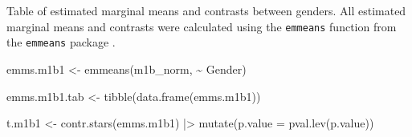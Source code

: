 \documentclass[
  bookmarksnumbered]{article}
\newenvironment{Shaded}{\begin{snugshade}}{\end{snugshade}}
\newcommand{\AttributeTok}[1]{\textcolor[rgb]{0.80,0.80,0.80}{#1}}
\newcommand{\FunctionTok}[1]{\textcolor[rgb]{0.94,0.94,0.56}{#1}}
\newcommand{\NormalTok}[1]{\textcolor[rgb]{0.80,0.80,0.80}{#1}}
\newcommand{\OtherTok}[1]{\textcolor[rgb]{0.94,0.94,0.56}{#1}}
\newcommand{\SpecialCharTok}[1]{\textcolor[rgb]{0.86,0.64,0.64}{#1}}
\begin{document}
Table of estimated marginal means and contrasts between genders. All estimated marginal means and contrasts were calculated using the \texttt{emmeans} function from the \texttt{emmeans} package \autocite{emmeanscit}.

\begin{Shaded}
\begin{Highlighting}[]
\NormalTok{emms.m1b1 }\OtherTok{\textless{}{-}} \FunctionTok{emmeans}\NormalTok{(m1b\_norm, }\SpecialCharTok{\textasciitilde{}}\NormalTok{ Gender)}

\NormalTok{emms.m1b1.tab }\OtherTok{\textless{}{-}} \FunctionTok{tibble}\NormalTok{(}\FunctionTok{data.frame}\NormalTok{(emms.m1b1))}

\NormalTok{t.m1b1 }\OtherTok{\textless{}{-}} \FunctionTok{contr.stars}\NormalTok{(emms.m1b1) }\SpecialCharTok{|\textgreater{}} 
  \FunctionTok{mutate}\NormalTok{(}\AttributeTok{p.value =} \FunctionTok{pval.lev}\NormalTok{(p.value))}


\end{Highlighting}
\end{Shaded}
\end{document}
